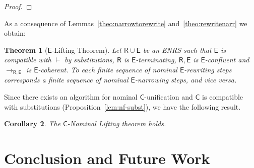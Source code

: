 \documentclass[11pt,a4paper]{amsart}
\newcommand{\alert}[1]{\textcolor{red}{#1}}
\newcommand{\theory}[1]{\ensuremath{\mathsf{#1}}}
\theoremstyle{plain}
\newtheorem{theorem}{Theorem}[section]
\newtheorem{corollary}[theorem]{Corollary}
\theoremstyle{definition}
\theoremstyle{remark}
\begin{document}
\begin{proof}

\end{proof}

As a consequence of Lemmas~\ref{theo:narrowtorewrite} and~\ref{theo:rewritenarr} we obtain:

\begin{theorem}[$\theory{E}$-Lifting Theorem]\label{teo:Clifitng} 
Let $\theory{R}{\cup}\theory{E}$ be an ENRS such that \theory{E} is compatible with $\vdash$ by substitutions,  $\theory{R}$ is  \theory{E}-terminating, \theory{R,E} is \theory{E}-confluent and $\to_{\theory{R,E}}$ is $\theory{E}$-coherent.
To each finite sequence of nominal \theory{E}-rewriting steps corresponds a  finite sequence of nominal $\theory{E}$-narrowing steps, and vice versa.
\end{theorem}

Since there exists an algorithm for nominal \theory{C}-unification and \theory{C} is compatible with substitutions (Proposition~\ref{lem:nf-subst}), we have the following result.
\begin{corollary}
    The \theory{C}-Nominal Lifting theorem holds.
\end{corollary}

\section{Conclusion and Future Work}
\label{sect:future-work}
\end{document}
